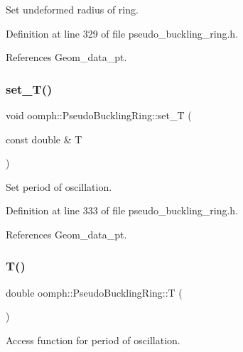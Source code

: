 Set undeformed radius of ring. 



Definition at line 329 of file pseudo\+\_\+buckling\+\_\+ring.\+h.



References Geom\+\_\+data\+\_\+pt.

\mbox{\label{classoomph_1_1PseudoBucklingRing_a37ea2b2f4e889e187eda1d46ba0b27ce}} 
\subsubsection{\texorpdfstring{set\+\_\+\+T()}{set\_T()}}
{\footnotesize\ttfamily void oomph\+::\+Pseudo\+Buckling\+Ring\+::set\+\_\+T (\begin{DoxyParamCaption}\item[{const double \&}]{T }\end{DoxyParamCaption})\hspace{0.3cm}{\ttfamily [inline]}}



Set period of oscillation. 



Definition at line 333 of file pseudo\+\_\+buckling\+\_\+ring.\+h.



References Geom\+\_\+data\+\_\+pt.

\mbox{\label{classoomph_1_1PseudoBucklingRing_af53f509aa119f74c77ae45046023f28f}} 
\subsubsection{\texorpdfstring{T()}{T()}}
{\footnotesize\ttfamily double oomph\+::\+Pseudo\+Buckling\+Ring\+::T (\begin{DoxyParamCaption}{ }\end{DoxyParamCaption})\hspace{0.3cm}{\ttfamily [inline]}}



Access function for period of oscillation. 



